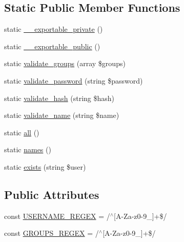 \subsection*{Static Public Member Functions}
\begin{DoxyCompactItemize}
\item 
static \hyperlink{classlibresignage_1_1common_1_1php_1_1auth_1_1User_a02a5ffc7778a503b2baf2ce26397ec40}{\+\_\+\+\_\+exportable\+\_\+private} ()
\item 
static \hyperlink{classlibresignage_1_1common_1_1php_1_1auth_1_1User_ae318f34411e98ae8970e569a2bda20e0}{\+\_\+\+\_\+exportable\+\_\+public} ()
\item 
static \hyperlink{classlibresignage_1_1common_1_1php_1_1auth_1_1User_a46971866d7e0f29606df5c2ac6f58285}{validate\+\_\+groups} (array \$groups)
\item 
static \hyperlink{classlibresignage_1_1common_1_1php_1_1auth_1_1User_aed34cefd4acec8df2201a784185f21c2}{validate\+\_\+password} (string \$password)
\item 
static \hyperlink{classlibresignage_1_1common_1_1php_1_1auth_1_1User_aa7f7b7f85ff1e6b115dbff844bde4d30}{validate\+\_\+hash} (string \$hash)
\item 
static \hyperlink{classlibresignage_1_1common_1_1php_1_1auth_1_1User_aaa1e2c403cf7dedd68c2e832719bc852}{validate\+\_\+name} (string \$name)
\item 
static \hyperlink{classlibresignage_1_1common_1_1php_1_1auth_1_1User_a2e06cc5de5496d8cc87bc4fa74042162}{all} ()
\item 
static \hyperlink{classlibresignage_1_1common_1_1php_1_1auth_1_1User_ade3e97db7135ba04fa33c4e3aa763d74}{names} ()
\item 
static \hyperlink{classlibresignage_1_1common_1_1php_1_1auth_1_1User_a29b2b1bfa6e43685782cdffd4e862918}{exists} (string \$user)
\end{DoxyCompactItemize}
\subsection*{Public Attributes}
\begin{DoxyCompactItemize}
\item 
const \hyperlink{classlibresignage_1_1common_1_1php_1_1auth_1_1User_afbec721eea17c9c4102a1f1716c393c1}{U\+S\+E\+R\+N\+A\+M\+E\+\_\+\+R\+E\+G\+EX} = \textquotesingle{}/$^\wedge$\mbox{[}A-\/Za-\/z0-\/9\+\_\+\mbox{]}+\$/\textquotesingle{}
\item 
const \hyperlink{classlibresignage_1_1common_1_1php_1_1auth_1_1User_ac3255ceb6caad837e60acfdec44fe65b}{G\+R\+O\+U\+P\+S\+\_\+\+R\+E\+G\+EX} = \textquotesingle{}/$^\wedge$\mbox{[}A-\/Za-\/z0-\/9\+\_\+\mbox{]}+\$/\textquotesingle{}
\end{DoxyCompactItemize}
